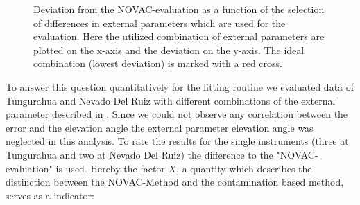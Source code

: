 \documentclass  [
  paper    = a4,
  BCOR     = 10mm,
  twoside,
  fontsize = 12pt,
  fleqn,
  toc      = bibnumbered,
  toc      = listofnumbered,
  numbers  = noendperiod,
  headings = normal,
  listof   = leveldown,
  version  = 3.03
]                                       {scrreprt}
\begin{document}
	\begin{figure}
		\caption{Deviation from the NOVAC-evaluation as a function of the selection of differences in external parameters which are used for the evaluation. Here the utilized combination of external parameters are plotted on the x-axis and the deviation on the y-axis. The ideal combination (lowest deviation) is marked with a red cross.}
		\label{fig:WelcheEP}
	\end{figure}
	To answer this question quantitatively for the fitting routine we evaluated data of Tungurahua and Nevado Del Ruiz with different combinations of the external parameter described in . Since we could not observe any correlation between the  error and the elevation angle the external parameter elevation angle was neglected in this analysis. To rate the results for the single instruments (three at Tungurahua and two at Nevado Del Ruiz) the difference to the "NOVAC-evaluation" is used. Hereby the factor $X$, a quantity which describes the distinction between the NOVAC-Method and the contamination based method, serves as a indicator:
\end{document}
